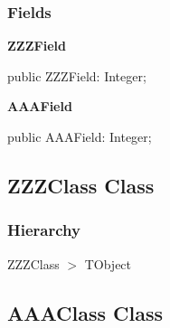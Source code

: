 \documentclass{report}
\newif\ifpdf
\begin{document}
\subsubsection*{\large{\textbf{Fields}}\normalsize\hspace{1ex}\hfill}
\begin{list}{}{
\setlength{\itemindent}{0cm}
\setlength{\listparindent}{0cm}
\setlength{\leftmargin}{\evensidemargin}
\addtolength{\leftmargin}{\tmplength}
\settowidth{\labelsep}{X}
\addtolength{\leftmargin}{\labelsep}
\setlength{\labelwidth}{\tmplength}
}
\label{ok_sorting.TMyRecord-ZZZField}
\item[\textbf{ZZZField}\hfill]
\ifpdf
\begin{flushleft}
\fi
\begin{ttfamily}
public ZZZField: Integer;\end{ttfamily}

\ifpdf
\end{flushleft}
\fi


\par  \label{ok_sorting.TMyRecord-AAAField}
\item[\textbf{AAAField}\hfill]
\ifpdf
\begin{flushleft}
\fi
\begin{ttfamily}
public AAAField: Integer;\end{ttfamily}

\ifpdf
\end{flushleft}
\fi


\par  \end{list}
\ifpdf
\subsection*{\large{\textbf{ZZZClass Class}}\normalsize\hspace{1ex}\hrulefill}
\else
\subsection*{ZZZClass Class}
\fi
\label{ok_sorting.ZZZClass}
\subsubsection*{\large{\textbf{Hierarchy}}\normalsize\hspace{1ex}\hfill}
ZZZClass {$>$} TObject
\ifpdf
\subsection*{\large{\textbf{AAAClass Class}}\normalsize\hspace{1ex}\hrulefill}
\else
\end{document}
